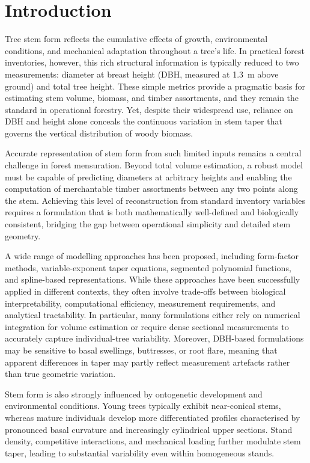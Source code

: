 \documentclass[twocolumn, bibliography=totoc]{scrartcl}
\begin{document}
\tableofcontents

\section{Introduction}

Tree stem form reflects the cumulative effects of growth, environmental conditions, and mechanical adaptation throughout a tree's life. In practical forest inventories, however, this rich structural information is typically reduced to two measurements: diameter at breast height (DBH, measured at \qty{1.3}{m} above ground) and total tree height. These simple metrics provide a pragmatic basis for estimating stem volume, biomass, and timber assortments, and they remain the standard in operational forestry. Yet, despite their widespread use, reliance on DBH and height alone conceals the continuous variation in stem taper that governs the vertical distribution of woody biomass.

Accurate representation of stem form from such limited inputs remains a central challenge in forest mensuration. Beyond total volume estimation, a robust model must be capable of predicting diameters at arbitrary heights and enabling the computation of merchantable timber assortments between any two points along the stem. Achieving this level of reconstruction from standard inventory variables requires a formulation that is both mathematically well-defined and biologically consistent, bridging the gap between operational simplicity and detailed stem geometry.

A wide range of modelling approaches has been proposed, including form-factor methods, variable-exponent taper equations, segmented polynomial functions, and spline-based representations. While these approaches have been successfully applied in different contexts, they often involve trade-offs between biological interpretability, computational efficiency, measurement requirements, and analytical tractability. In particular, many formulations either rely on numerical integration for volume estimation or require dense sectional measurements to accurately capture individual-tree variability. Moreover, DBH-based formulations may be sensitive to basal swellings, buttresses, or root flare, meaning that apparent differences in taper may partly reflect measurement artefacts rather than true geometric variation.

Stem form is also strongly influenced by ontogenetic development and environmental conditions. Young trees typically exhibit near-conical stems, whereas mature individuals develop more differentiated profiles characterised by pronounced basal curvature and increasingly cylindrical upper sections. Stand density, competitive interactions, and mechanical loading further modulate stem taper, leading to substantial variability even within homogeneous stands.
\end{document}
